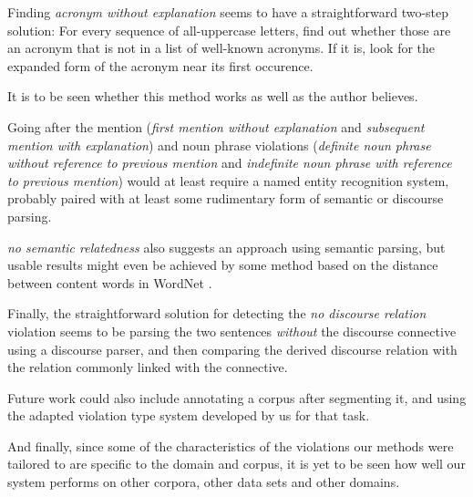 \documentclass[a4paper,10pt]{scrartcl}
\theoremstyle{style}
\begin{document}
Finding \textit{acronym without explanation} seems to have a straightforward two-step solution: For every sequence of all-uppercase letters, find out whether those are an acronym that is not in a list of well-known acronyms. If it is, look for the expanded form of the acronym near its first occurence.

It is to be seen whether this method works as well as the author believes.

Going after the mention (\textit{first mention without explanation} and \textit{subsequent mention with explanation}) and noun phrase violations (\textit{definite noun phrase without reference to previous mention} and \textit{indefinite noun phrase with reference to previous mention}) would at least require a named entity recognition system, probably paired with at least some rudimentary form of semantic or discourse parsing.

\textit{no semantic relatedness} also suggests an approach using semantic parsing, but usable results might even be achieved by some method based on the distance between content words in WordNet \citep{fellbaum2005wordnet}.

Finally, the straightforward solution for detecting the \textit{no discourse relation} violation seems to be parsing the two sentences \textit{without} the discourse connective using a discourse parser, and then comparing the derived discourse relation with the relation commonly linked with the connective.

Future work could also include annotating a corpus after segmenting it, and using the adapted violation type system developed by us for that task.

And finally, since some of the characteristics of the violations our methods were tailored to are specific to the domain and corpus, it is yet to be seen how well our system performs on other corpora, other data sets and other domains.

\newpage


\end{document}
